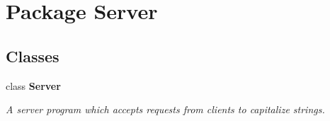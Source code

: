 \section{Package Server}
\label{namespace_server}
\subsection*{Classes}
\begin{DoxyCompactItemize}
\item 
class \textbf{ Server}
\begin{DoxyCompactList}\small\item\em A server program which accepts requests from clients to capitalize strings. \end{DoxyCompactList}\end{DoxyCompactItemize}
